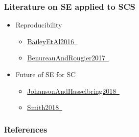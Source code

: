 \documentclass[t,12pt,numbers,fleqn]{beamer}
\begin{document}
\begin{frame}
\frametitle{Literature on SE applied to SCS}

\begin {itemize}

\item Reproducibility
\begin{itemize}
\item
  \href{https://gitlab.cas.mcmaster.ca/smiths/cas741/blob/master/ReferenceMaterial/BaileyEtAl2016.pdf}
  {BaileyEtAl2016~\cite{BaileyEtAl2016}}
\item
  \href{https://gitlab.cas.mcmaster.ca/smiths/cas741/blob/master/ReferenceMaterial/BenureauAndRougier2017.pdf}
  {BenureauAndRougier2017~\cite{BenureauAndRougier2017}}
\end{itemize}

\item Future of SE for SC
\begin{itemize}
\item
  \href{https://gitlab.cas.mcmaster.ca/smiths/cas741/blob/master/ReferenceMaterial/JohansonAndHasselbring2018.pdf}
  {JohansonAndHasselbring2018~\cite{JohansonAndHasselbring2018}}
\item
  \href{https://gitlab.cas.mcmaster.ca/smiths/cas741/blob/master/ReferenceMaterial/Smith2018.pdf}
  {Smith2018~\cite{Smith2018}}
\end{itemize}

\end{itemize}

\end{frame}


\begin{frame}[allowframebreaks]
\frametitle{References}



\end{frame}

\end{document}
